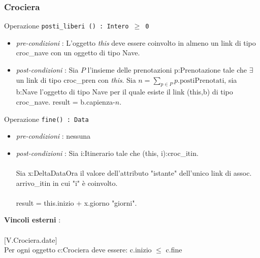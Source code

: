 \documentclass[12pt, letterpaper]{article}
\newcommand{\acc}{\\\hphantom{}\\}
\newcommand{\code}[1]{\colorbox{light-gray}{\texttt{#1}}}
\begin{document}
\subsubsection{Crociera}
Operazione \code{posti\_liberi () : Intero $\ge$ 0}\begin{itemize}
    \item \textit{pre-condizioni} : L'oggetto \textit{this} deve essere coinvolto in almeno un link di 
    tipo croc\_nave con un oggetto di tipo Nave.
    \item \textit{post-condizioni} : Sia $P$ l'insieme delle prenotazioni p:Prenotazione tale che 
    $\exists$ un link di tipo croc\_pren con \textit{this}. Sia
     $n=\displaystyle\sum_{p\in P}p.\text{postiPrenotati}$, sia b:Nave l'oggetto di tipo Nave 
     per il quale esiste il link (this,b) di tipo croc\_nave. result = b.capienza-$n$.
\end{itemize}
Operazione \code{fine() : Data}\begin{itemize}
    \item \textit{pre-condizioni} : nessuna
    \item \textit{post-condizioni} : Sia i:Itinerario tale che (this, i):croc\_itin.\acc
          Sia x:DeltaDataOra il valore dell'attributo "istante" dell'unico link di assoc.
          arrivo\_itin in cui "i" è coinvolto.\acc
          result = this.inizio + x.giorno "giorni".
\end{itemize}
\textbf{Vincoli esterni} :\acc
$[$V.Crociera.date$]$\\
\hphantom{ident}Per ogni oggetto c:Crociera deve essere: c.inizio $\le$ c.fine\acc
\end{document}
